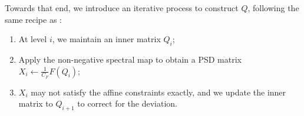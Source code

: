 \documentclass[12pt]{article}
\newcommand{\Authornote}[3]{{\sf\footnotesize\color{#3}{[#1: #2]}}}
\newcommand{\Authornote}[3]{}
\newcommand{\jnote}[1]{\Authornote{Jeff}{#1}{blue}}
\begin{document}
 Towards that end, we introduce an iterative process to construct \(Q\), following the same recipe %
 as \cite{PotechinXu2026Theta}:  
\begin{enumerate}
	\item At level \(i\), we maintain an inner matrix \(Q_i\);
	\item Apply the non-negative spectral map to obtain a PSD matrix $X_i \leftarrow \frac{1}{C_F} F(Q_i) $;
	\item $X_i$ may not satisfy the affine constraints exactly, and we update the inner matrix to $Q_{i+1}$ to correct for the deviation. \end{enumerate} 
%
\end{document}
